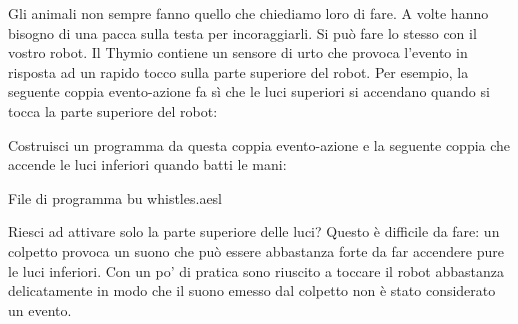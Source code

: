 



Gli animali non sempre fanno quello che chiediamo loro di fare. A volte hanno bisogno di una pacca
sulla testa per incoraggiarli. Si può fare lo stesso con il vostro robot. Il
Thymio contiene un sensore di urto che provoca l'evento  in risposta ad un rapido tocco sulla parte superiore del robot. Per esempio,
la seguente coppia evento-azione fa sì che le luci superiori si accendano quando
si tocca la parte superiore del robot: 

Costruisci un programma da questa coppia evento-azione e la seguente coppia
che accende le luci inferiori quando batti le mani: 

{\raggedleft \hfill File di programma {bu whistles.aesl}}

Riesci ad attivare solo la parte superiore delle luci? Questo è difficile da fare: un colpetto
provoca un suono che può essere abbastanza forte da far accendere pure le luci inferiori. Con un po' di pratica sono riuscito a toccare il robot
abbastanza delicatamente in modo che il suono emesso dal colpetto non è stato considerato un evento.


